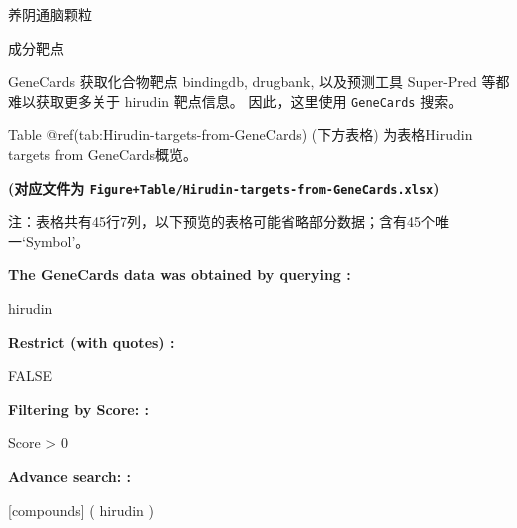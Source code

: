 \documentclass[
  ignorenonframetext,
]{beamer}
\begin{document}
\begin{frame}[fragile]{养阴通脑颗粒}
\begin{block}{成分靶点}
\begin{block}{GeneCards 获取化合物靶点}
bindingdb, drugbank, 以及预测工具 Super-Pred 等都难以获取更多关于
hirudin 靶点信息。 因此，这里使用 \texttt{GeneCards} 搜索。

Table @ref(tab:Hirudin-targets-from-GeneCards) (下方表格) 为表格Hirudin
targets from GeneCards概览。

\textbf{(对应文件为
\texttt{Figure+Table/Hirudin-targets-from-GeneCards.xlsx})}

\begin{center}\begin{tcolorbox}[colback=gray!10, colframe=gray!50, width=0.9\linewidth, arc=1mm, boxrule=0.5pt]注：表格共有45行7列，以下预览的表格可能省略部分数据；含有45个唯一`Symbol'。
\end{tcolorbox}
\end{center}\begin{center}\begin{tcolorbox}[colback=gray!10, colframe=gray!50, width=0.9\linewidth, arc=1mm, boxrule=0.5pt]
\textbf{
The GeneCards data was obtained by querying
:}

\vspace{0.5em}

    hirudin

\vspace{2em}


\textbf{
Restrict (with quotes)
:}

\vspace{0.5em}

    FALSE

\vspace{2em}


\textbf{
Filtering by Score:
:}

\vspace{0.5em}

    Score > 0

\vspace{2em}


\textbf{
Advance search:
:}

\vspace{0.5em}

    [compounds] ( hirudin )

\vspace{2em}
\end{tcolorbox}
\end{center}


\end{block}
\end{block}
\end{frame}
\end{document}
